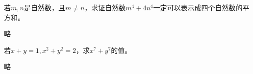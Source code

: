 \documentclass[windows,csize4]{BHCexam}
\begin{document}
\begin{groups}
\begin{questions}[]
        \question[5] 若$m,n$是自然数，且$m\neq n$，求证\quad 自然数$m^4+4n^4$一定可以表示成四个自然数的平方和。
        \begin{solution}{0.5cm}
            \methodonly 略
        \end{solution}
        \vspace{3.5cm}

        \question[5] 若$x+y=1,x^2+y^2=2$，求$x^7+y^7$的值。
        \begin{solution}{0.5cm}
            \methodonly 略
        \end{solution}
    \end{questions}

\end{groups}
\label{lastpage}
\end{document}
